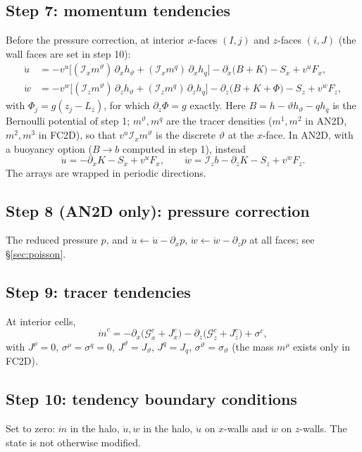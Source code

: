 \documentclass[11pt,a4paper]{article}
\newcommand{\vt}{\vartheta}                    %
\newcommand{\hth}{{h_{\vartheta}}}               %
\newcommand{\hq}{{h_q}}                          %
\newcommand{\Ix}{\mathcal{I}_x}
\newcommand{\Iz}{\mathcal{I}_z}
\begin{document}
\subsection{Step 7: momentum tendencies}
Before the pressure correction, at interior $x$-faces $(I,j)$ and $z$-faces $(i,J)$ (the wall faces are set in step 10):
\begin{align}
  \dot u&=-v^u\Big[(\Ix m^\vt)\,\partial_x\hth+(\Ix m^q)\,\partial_x\hq\Big]-\partial_x\big(B+K\big)-S_x+v^uF_x,
  \label{eq:udot}\\
  \dot w&=-v^w\Big[(\Iz m^\vt)\,\partial_z\hth+(\Iz m^q)\,\partial_z\hq\Big]-\partial_z\big(B+K+\Phi\big)-S_z+v^wF_z,
  \label{eq:wdot}
\end{align}
with $\Phi_j=g(z_j-L_z)$, for which $\partial_z\Phi=g$ exactly. Here $B=h-\vt\hth-q\hq$ is the Bernoulli potential of step 1; $m^\vt,m^q$ are the tracer densities ($m^1,m^2$ in AN2D, $m^2,m^3$ in FC2D), so that $v^u\Ix m^\vt$ is the discrete $\vt$ at the $x$-face.
In AN2D, with a buoyancy option ($B\to b$ computed in step 1), instead
\begin{equation}
  \dot u=-\partial_xK-S_x+v^uF_x,\qquad\dot w=\Iz b-\partial_zK-S_z+v^wF_z .
\end{equation}
The arrays are wrapped in periodic directions.

\subsection{Step 8 (AN2D only): pressure correction}
The reduced pressure $p$, and $\dot u\leftarrow\dot u-\partial_xp$, $\dot w\leftarrow\dot w-\partial_zp$ at all faces; see \S\ref{sec:poisson}.

\subsection{Step 9: tracer tendencies}
At interior cells,
\begin{equation}
  \dot m^c=-\partial_x\big(\mathcal G^c_x+J^c_x\big)-\partial_z\big(\mathcal G^c_z+J^c_z\big)+\sigma^c,
  \label{eq:mdot}
\end{equation}
with $J^\rho=0$, $\sigma^\rho=\sigma^q=0$, $J^\vt=J_\vt$, $J^q=J_q$, $\sigma^\vt=\sigma_\vt$ (the mass $m^\rho$ exists only in FC2D).

\subsection{Step 10: tendency boundary conditions}
Set to zero: $\dot m$ in the halo, $\dot u,\dot w$ in the halo, $\dot u$ on $x$-walls and $\dot w$ on $z$-walls. The state is not otherwise modified.
\end{document}

